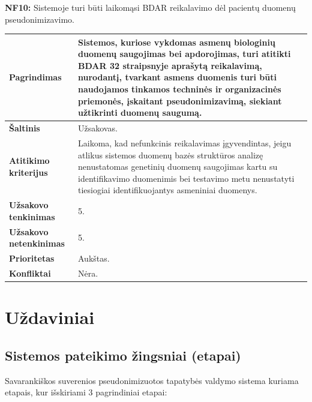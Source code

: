 \documentclass[12pt]{article}
\begin{document}
\noindent \textbf{NF10:} Sistemoje turi būti laikomąsi BDAR reikalavimo dėl
pacientų duomenų pseudonimizavimo.
\label{sec:NF10}
\begin{table}[htb!]
    \captionsetup{justification=centering}
    \vskip -10pt
    \begin{tabular}{|m{4.9cm}|m{11cm}|}
        \hline
        \raggedleft \textbf{\cellcolor{deepchampagne}Pagrindimas} &
        Sistemos, kuriose vykdomas asmenų biologinių duomenų saugojimas bei
        apdorojimas, turi atitikti BDAR 32 straipsnyje aprašytą reikalavimą,
        nurodantį, tvarkant asmens duomenis turi būti naudojamos tinkamos
        techninės ir organizacinės priemonės, įskaitant pseudonimizavimą,
        siekiant užtikrinti duomenų saugumą. \\
        \hline
        \raggedleft \textbf{\cellcolor{deepchampagne}Šaltinis} & Užsakovas. \\
        \hline
        \raggedleft \textbf{\cellcolor{deepchampagne}Atitikimo kriterijus} & 
        Laikoma, kad nefunkcinis reikalavimas įgyvendintas, jeigu atlikus
        sistemos duomenų bazės struktūros analizę nenustatomas genetinių duomenų
        saugojimas kartu su identifikavimo duomenimis bei testavimo metu
        nenustatyti tiesiogiai identifikuojantys asmeniniai duomenys. \\
        \hline
        \raggedleft \textbf{\cellcolor{deepchampagne}Užsakovo tenkinimas} & 5. \\
        \hline
        \raggedleft \textbf{\cellcolor{deepchampagne}Užsakovo netenkinimas} & 5. \\
        \hline
        \raggedleft \textbf{\cellcolor{deepchampagne}Prioritetas} & Aukštas. \\
        \hline
        \raggedleft \textbf{\cellcolor{deepchampagne}Konfliktai} & Nėra. \\
        \hline
    \end{tabular}
\end{table}

\newpage

\newpage

\section{Uždaviniai}
\subsection{Sistemos pateikimo žingsniai (etapai)}
Savarankiškos suverenios pseudonimizuotos tapatybės valdymo sistema kuriama
etapais, kur išskiriami 3 pagrindiniai etapai:
\end{document}
